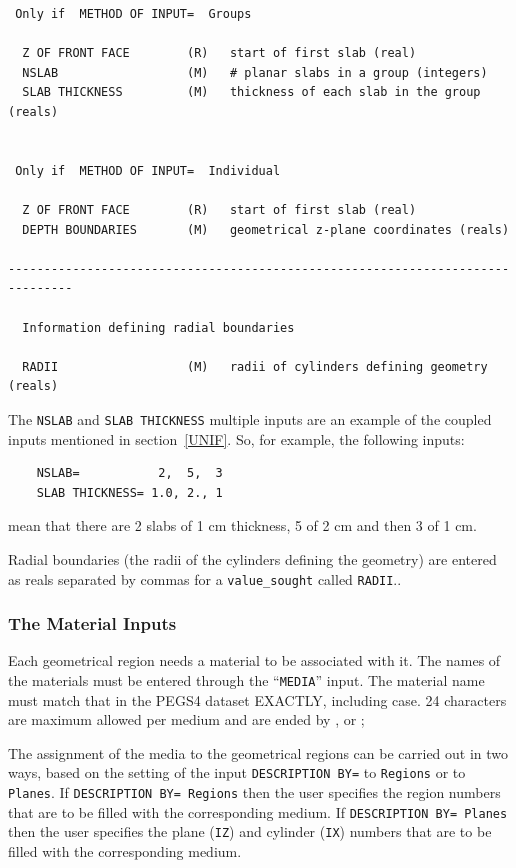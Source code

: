\documentclass[12pt,twoside]{article}  %
\begin{document}
\begin{verbatim}
 Only if  METHOD OF INPUT=  Groups

  Z OF FRONT FACE        (R)   start of first slab (real)
  NSLAB                  (M)   # planar slabs in a group (integers)
  SLAB THICKNESS         (M)   thickness of each slab in the group (reals)


 Only if  METHOD OF INPUT=  Individual

  Z OF FRONT FACE        (R)   start of first slab (real)
  DEPTH BOUNDARIES       (M)   geometrical z-plane coordinates (reals)

-------------------------------------------------------------------------------

  Information defining radial boundaries

  RADII                  (M)   radii of cylinders defining geometry (reals)

\end{verbatim}
  
 
The {\tt NSLAB} and {\tt SLAB THICKNESS} multiple inputs are an example of
the coupled inputs mentioned in section~\ref{UNIF}.  So, for example, the
following inputs:\\
\begin{verbatim}
    NSLAB=           2,  5,  3
    SLAB THICKNESS= 1.0, 2., 1
\end{verbatim}
mean that there are 2 slabs of 1 cm thickness, 5 of 2 cm and then 3 of 1
cm.

Radial boundaries (the radii of the cylinders defining the geometry) 
are entered as reals separated by commas for a {\tt value\_sought} called
{\tt RADII}..

\subsubsection{The Material Inputs}

Each geometrical region needs a material to be associated with it.
The names of the materials must be entered through the ``\verb+MEDIA+''
input. The material name must match that in the PEGS4 dataset EXACTLY, 
including case. 24 characters are maximum allowed per medium and
are ended by , or ;

The assignment of the media to the geometrical
regions can be carried out in two ways, based on the setting
of the input \verb+DESCRIPTION BY=+ to \verb+Regions+ or to
\verb+Planes+.  If {\tt DESCRIPTION BY= Regions} then the user
specifies the region numbers that are to
be filled with the corresponding medium.  If
{\tt DESCRIPTION BY= Planes} then the user specifies the
plane ({\tt IZ}) and cylinder ({\tt IX}) numbers that are
to be filled with the corresponding medium.  
\end{document}
